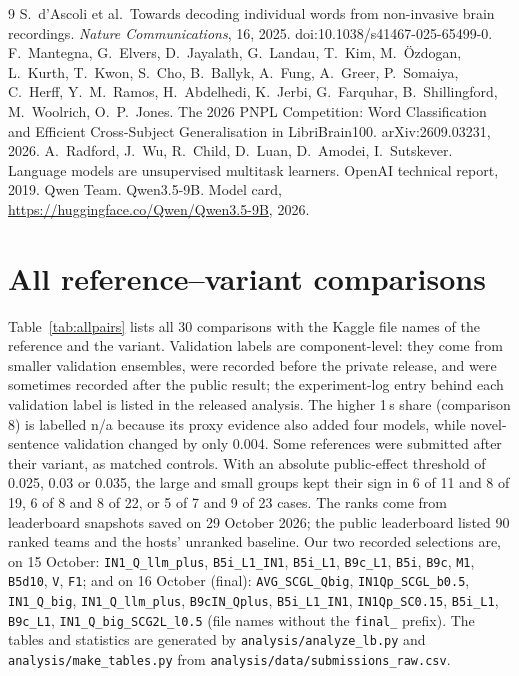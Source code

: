 \documentclass{article}
\begin{document}
{\small
\begin{thebibliography}{9}
 S.~d'Ascoli et al.\ Towards decoding individual words from non-invasive brain recordings. \emph{Nature Communications}, 16, 2025. doi:10.1038/s41467-025-65499-0.
 F.~Mantegna, G.~Elvers, D.~Jayalath, G.~Landau, T.~Kim, M.~\"{O}zdogan, L.~Kurth, T.~Kwon, S.~Cho, B.~Ballyk, A.~Fung, A.~Greer, P.~Somaiya, C.~Herff, Y.~M.~Ramos, H.~Abdelhedi, K.~Jerbi, G.~Farquhar, B.~Shillingford, M.~Woolrich, O.~P.~Jones. The 2026 PNPL Competition: Word Classification and Efficient Cross-Subject Generalisation in LibriBrain100. arXiv:2609.03231, 2026.
 A.~Radford, J.~Wu, R.~Child, D.~Luan, D.~Amodei, I.~Sutskever. Language models are unsupervised multitask learners. OpenAI technical report, 2019.
 Qwen Team. Qwen3.5-9B. Model card, \url{https://huggingface.co/Qwen/Qwen3.5-9B}, 2026.
\end{thebibliography}
}

\appendix
\section{All reference--variant comparisons}
\label{app:pairs}
{\raggedright Table~\ref{tab:allpairs} lists all 30 comparisons with the Kaggle file names of the reference and the variant. Validation labels are component-level: they come from smaller validation ensembles, were recorded before the private release, and were sometimes recorded after the public result; the experiment-log entry behind each validation label is listed in the released analysis. The higher 1\,s share (comparison 8) is labelled n/a because its proxy evidence also added four models, while novel-sentence validation changed by only 0.004. Some references were submitted after their variant, as matched controls. With an absolute public-effect threshold of 0.025, 0.03 or 0.035, the large and small groups kept their sign in 6 of 11 and 8 of 19, 6 of 8 and 8 of 22, or 5 of 7 and 9 of 23 cases. The ranks come from leaderboard snapshots saved on 29 October 2026; the public leaderboard listed 90 ranked teams and the hosts' unranked baseline. Our two recorded selections are, on 15 October: \texttt{IN1\_Q\_llm\_plus}, \texttt{B5i\_L1\_IN1}, \texttt{B5i\_L1}, \texttt{B9c\_L1}, \texttt{B5i}, \texttt{B9c}, \texttt{M1}, \texttt{B5d10}, \texttt{V}, \texttt{F1}; and on 16 October (final): \texttt{AVG\_SCGL\_Qbig}, \texttt{IN1Qp\_SCGL\_b0.5}, \texttt{IN1\_Q\_big}, \texttt{IN1\_Q\_llm\_plus}, \texttt{B9cIN\_Qplus}, \texttt{B5i\_L1\_IN1}, \texttt{IN1Qp\_SC0.15}, \texttt{B5i\_L1}, \texttt{B9c\_L1}, \texttt{IN1\_Q\_big\_SCG2L\_l0.5} (file names without the \texttt{final\_} prefix). The tables and statistics are generated by \texttt{analysis/analyze\_lb.py} and \texttt{analysis/make\_tables.py} from \texttt{analysis/data/submissions\_raw.csv}.\par}
\end{document}
